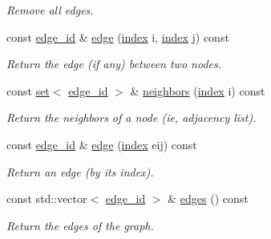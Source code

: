 \begin{DoxyCompactItemize}
\begin{DoxyCompactList}\small\item\em Remove all edges. \end{DoxyCompactList}\item 
const \hyperlink{structmerlin_1_1edge__id}{edge\+\_\+id} \& \hyperlink{classmerlin_1_1graph_ac245de085fc9a8b34a6dd3bf9459815d}{edge} (\hyperlink{classmerlin_1_1graph_a5cade38832f47248573e921276f122d6}{index} i, \hyperlink{classmerlin_1_1graph_a5cade38832f47248573e921276f122d6}{index} j) const 
\begin{DoxyCompactList}\small\item\em Return the edge (if any) between two nodes. \end{DoxyCompactList}\item 
const \hyperlink{classmerlin_1_1set}{set}$<$ \hyperlink{structmerlin_1_1edge__id}{edge\+\_\+id} $>$ \& \hyperlink{classmerlin_1_1graph_a3681cb03e7596b425b6b5641ba5d6404}{neighbors} (\hyperlink{classmerlin_1_1graph_a5cade38832f47248573e921276f122d6}{index} i) const 
\begin{DoxyCompactList}\small\item\em Return the neighbors of a node (ie, adjacency list). \end{DoxyCompactList}\item 
const \hyperlink{structmerlin_1_1edge__id}{edge\+\_\+id} \& \hyperlink{classmerlin_1_1graph_adfb67c1cfa94e88a90b9708607bcacb0}{edge} (\hyperlink{classmerlin_1_1graph_a5cade38832f47248573e921276f122d6}{index} eij) const 
\begin{DoxyCompactList}\small\item\em Return an edge (by its index). \end{DoxyCompactList}\item 
const std\+::vector$<$ \hyperlink{structmerlin_1_1edge__id}{edge\+\_\+id} $>$ \& \hyperlink{classmerlin_1_1graph_ab1d18f639ac9e5eb08061c8c011916f0}{edges} () const 
\begin{DoxyCompactList}\small\item\em Return the edges of the graph. \end{DoxyCompactList}\end{DoxyCompactItemize}
